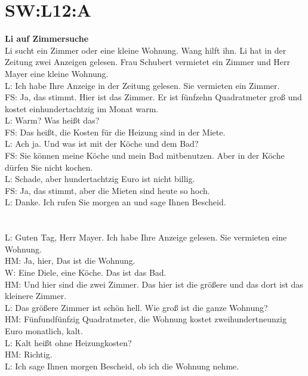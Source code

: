 \section{SW:L12:A}
\noindent
\textbf{Li auf Zimmersuche}  \\
Li sucht ein Zimmer oder eine kleine Wohnung. Wang hilft ihn.
Li hat in der Zeitung zwei Anzeigen gelesen.
Frau Schubert vermietet ein Zimmer und Herr Mayer eine kleine Wohnung. \\
L: Ich habe Ihre Anzeige in der Zeitung gelesen. Sie vermieten ein Zimmer. \\
FS: Ja, das stimmt. Hier ist das Zimmer. Er ist fünfzehn Quadratmeter groß und kostet einhundertachtzig im Monat  warm. \\
L: Warm? Was heißt das? \\
FS: Das heißt, die Kosten für die Heizung sind in der Miete.  \\
L: Ach ja. Und was ist mit der Köche und dem Bad? \\
FS: Sie können meine Köche und mein Bad mitbenutzen. Aber in der Köche dürfen Sie nicht kochen. \\
L: Schade, aber hundertachtzig Euro ist nicht billig. \\
FS: Ja, das stimmt, aber die Mieten sind heute so hoch. \\
L: Danke. Ich rufen Sie morgen an und sage Ihnen Bescheid.  \\
\\
\\
\noindent
L: Guten Tag, Herr Mayer. Ich habe Ihre Anzeige gelesen. Sie vermieten eine Wohnung. \\
HM: Ja, hier, Das ist die Wohnung. \\
W: Eine Diele, eine Köche. Das ist das Bad. \\
HM: Und hier sind die zwei Zimmer. Das hier ist die größere und das dort ist das kleinere Zimmer. \\
L: Das größere Zimmer ist schön hell. Wie groß ist die ganze Wohnung? \\
HM: Fünfundfünfzig Quadratmeter, die Wohnung kostet zweihundertneunzig Euro monatlich, kalt. \\
L: Kalt heißt ohne Heizungkosten? \\
HM: Richtig. \\
L: Ich sage Ihnen morgen Bescheid, ob ich die Wohnung nehme.  \\
